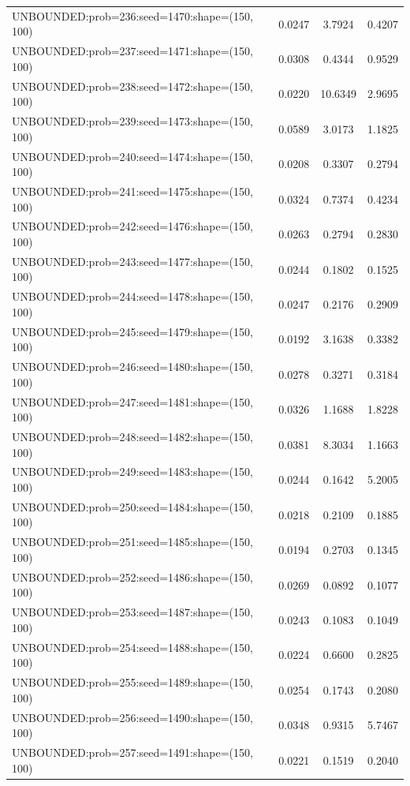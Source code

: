 \begin{longtable}{lccc}
UNBOUNDED:prob=236:seed=1470:shape=(150, 100) &   0.0247 &  3.7924 &  0.4207 \\
UNBOUNDED:prob=237:seed=1471:shape=(150, 100) &   0.0308 &  0.4344 &  0.9529 \\
UNBOUNDED:prob=238:seed=1472:shape=(150, 100) &   0.0220 & 10.6349 &  2.9695 \\
UNBOUNDED:prob=239:seed=1473:shape=(150, 100) &   0.0589 &  3.0173 &  1.1825 \\
UNBOUNDED:prob=240:seed=1474:shape=(150, 100) &   0.0208 &  0.3307 &  0.2794 \\
UNBOUNDED:prob=241:seed=1475:shape=(150, 100) &   0.0324 &  0.7374 &  0.4234 \\
UNBOUNDED:prob=242:seed=1476:shape=(150, 100) &   0.0263 &  0.2794 &  0.2830 \\
UNBOUNDED:prob=243:seed=1477:shape=(150, 100) &   0.0244 &  0.1802 &  0.1525 \\
UNBOUNDED:prob=244:seed=1478:shape=(150, 100) &   0.0247 &  0.2176 &  0.2909 \\
UNBOUNDED:prob=245:seed=1479:shape=(150, 100) &   0.0192 &  3.1638 &  0.3382 \\
UNBOUNDED:prob=246:seed=1480:shape=(150, 100) &   0.0278 &  0.3271 &  0.3184 \\
UNBOUNDED:prob=247:seed=1481:shape=(150, 100) &   0.0326 &  1.1688 &  1.8228 \\
UNBOUNDED:prob=248:seed=1482:shape=(150, 100) &   0.0381 &  8.3034 &  1.1663 \\
UNBOUNDED:prob=249:seed=1483:shape=(150, 100) &   0.0244 &  0.1642 &  5.2005 \\
UNBOUNDED:prob=250:seed=1484:shape=(150, 100) &   0.0218 &  0.2109 &  0.1885 \\
UNBOUNDED:prob=251:seed=1485:shape=(150, 100) &   0.0194 &  0.2703 &  0.1345 \\
UNBOUNDED:prob=252:seed=1486:shape=(150, 100) &   0.0269 &  0.0892 &  0.1077 \\
UNBOUNDED:prob=253:seed=1487:shape=(150, 100) &   0.0243 &  0.1083 &  0.1049 \\
UNBOUNDED:prob=254:seed=1488:shape=(150, 100) &   0.0224 &  0.6600 &  0.2825 \\
UNBOUNDED:prob=255:seed=1489:shape=(150, 100) &   0.0254 &  0.1743 &  0.2080 \\
UNBOUNDED:prob=256:seed=1490:shape=(150, 100) &   0.0348 &  0.9315 &  5.7467 \\
UNBOUNDED:prob=257:seed=1491:shape=(150, 100) &   0.0221 &  0.1519 &  0.2040 \\

\end{longtable}
